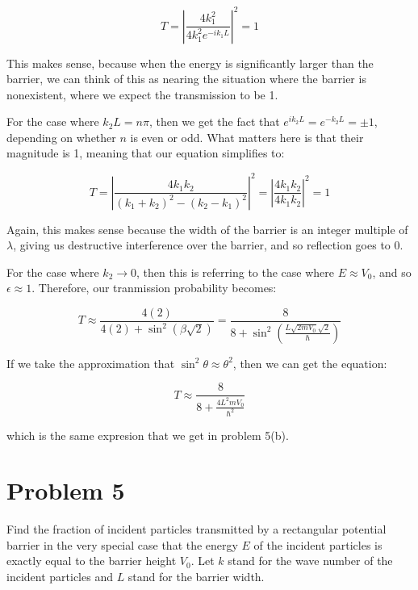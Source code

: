 \documentclass[10pt]{article}
\begin{document}
\begin{enumerate}[(a)]
\begin{solution}
            \[ T = \left|\frac{4k_1^2}{4k_1^2e^{-ik_1L}}\right|^2 = 1\] 

            This makes sense, because when the energy is significantly larger than the barrier, we can think of this as nearing the situation where the barrier is nonexistent, where we expect the transmission to be 1. 

            For the case where $k_2L = n\pi$, then we get the fact that $e^{ik_2L} = e^{-k_2L} = \pm 1$, depending on whether $n$ is even or odd. What matters here is that their magnitude is 1, meaning that our equation simplifies to: 

            \[ T = \left| \frac{4k_1k_2}{(k_1 + k_2)^2 - (k_2 - k_1)^2}\right|^2 = \left| \frac{4k_1k_2}{4k_1k_2}\right|^2 = 1\] 

            Again, this makes sense because the width of the barrier is an integer multiple of $\lambda$, giving us destructive interference over the barrier, and so reflection goes to 0. 

            For the case where $k_2 \to 0$, then this is referring to the case where $E \approx V_0$, and so $\epsilon \approx 1$. Therefore, our tranmission probability becomes: 

            \[ T \approx  \frac{4(2)}{4(2) + \sin^2(\beta \sqrt{2})} = \frac{8}{8 + \sin^2\left( \frac{L\sqrt{2mV_0} \sqrt{2}}{\hbar}\right)}\] 

            If we take the approximation that $\sin^2 \theta \approx \theta^2$, then we can get the equation: 

            \[ T \approx \frac{8}{8 + \frac{4L^2mV_0}{\hbar^2}}\] 

            which is the same expresion that we get in problem 5(b). 
        \end{solution}
    \end{enumerate}

    \pagebreak

    \section*{Problem 5}

    Find the fraction of incident particles transmitted by a rectangular potential barrier in the very special case that the energy $E$ of the incident particles is exactly equal to the barrier height $V_0$. Let $k$ stand for the wave number of the incident particles and $L$ stand for the barrier width. 

    \begin{center}
    \end{center}
\end{document}
